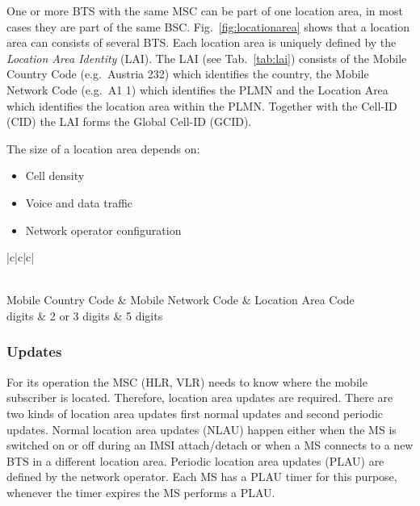 \documentclass[master,english]{hgbthesis}
\begin{document}
One or more BTS with the same MSC can be part of one location area, in most cases they are part of the same BSC. Fig.\ \ref{fig:locationarea} shows that a location area can consists of several BTS. Each location area is uniquely defined by the \emph{Location Area Identity} (LAI). The LAI (see Tab.\ \ref{tab:lai}) consists of the Mobile Country Code (e.g.\ Austria 232) which identifies the country, the Mobile Network Code (e.g.\ A1 1) which identifies the PLMN and the Location Area which identifies the location area within the PLMN. Together with the Cell-ID (CID) the LAI forms the Global Cell-ID (GCID). 

The size of a location area depends on:

\begin{itemize}

	\item Cell density

	\item Voice and data traffic

	\item Network operator configuration

\end{itemize}

\begin{table}

	\begin{tabular}{|c|c|c|}

		\hline  {} \\ 

		\hline Mobile Country Code & Mobile Network Code & Location Area Code \\ 

		 digits            & 2 or 3 digits       & 5 digits           \\ 

		\hline 

	\end{tabular}

	\caption{Parts of the Location Area Identity }

	\label{tab:lai}

\end{table}

\subsubsection{Updates}

For its operation the MSC (HLR, VLR) needs to know where the mobile subscriber is located. Therefore, location area updates are required. There are two kinds of location area updates first normal updates and second periodic updates. Normal location area updates (NLAU) happen either when the MS is switched on or off during an IMSI attach/detach or when a MS connects to a new BTS in a different location area. Periodic location area updates (PLAU) are defined by the network operator. Each MS has a PLAU timer for this purpose, whenever the timer expires the MS performs a PLAU.
\end{document}
